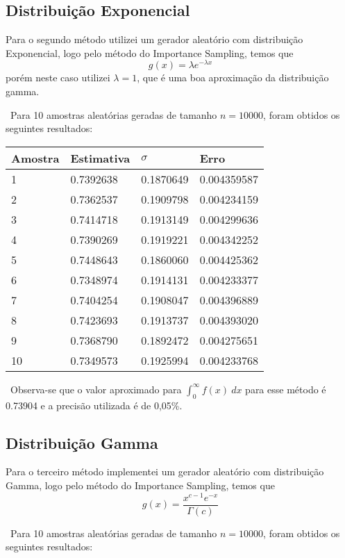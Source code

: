 \documentclass{article} %
\begin{document}
\subsection{Distribuição Exponencial}

\qquad Para o segundo método utilizei um gerador aleatório com distribuição Exponencial, logo pelo método do Importance Sampling, temos que $$g(x) = \lambda e^{-\lambda x}$$ porém neste caso utilizei $\lambda = 1$, que é uma boa aproximação da distribuição gamma.

\ Para 10 amostras aleatórias geradas de tamanho $n = 10000$, foram obtidos os seguintes resultados:

\begin{center}
\begin{tabular}{llll}
\hline
Amostra & Estimativa & $\sigma$ & Erro \\
\hline
1 & 0.7392638 & 0.1870649 & 0.004359587\\
2 & 0.7362537 & 0.1909798 & 0.004234159\\
3 & 0.7414718 & 0.1913149 & 0.004299636\\
4 & 0.7390269 & 0.1919221 & 0.004342252\\
5 & 0.7448643 & 0.1860060 & 0.004425362\\
6 & 0.7348974 & 0.1914131 & 0.004233377\\
7 & 0.7404254 & 0.1908047 & 0.004396889\\
8 & 0.7423693 & 0.1913737 & 0.004393020\\
9 & 0.7368790 & 0.1892472 & 0.004275651\\
10 & 0.7349573 & 0.1925994 & 0.004233768\\
\hline
\end{tabular}
\end{center}

\ Observa-se que o valor aproximado para $\int_{0}^{\infty} f(x) \ dx$ para esse método é  0.73904 e a precisão utilizada é de 0,05\%.

\subsection{Distribuição Gamma}

\qquad Para o terceiro método implementei um gerador aleatório com distribuição Gamma, logo pelo método do Importance Sampling, temos que $$g(x) = \frac{x^{c-1} e^{-x}}{\Gamma(c)}$$

\ Para 10 amostras aleatórias geradas de tamanho $n = 10000$, foram obtidos os seguintes resultados:
 
\end{document}
